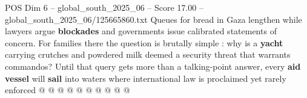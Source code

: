 \begin{textsample}{POS Dim 6 – global\_south\_2025\_06 – Score 17.00 – global\_south\_2025\_06/125665860.txt}
Queues for bread in Gaza lengthen while lawyers argue \textbf{blockades} and governments issue calibrated statements of concern.
For families there the question is brutally simple : why is a \textbf{yacht} carrying crutches and powdered milk deemed a security threat that warrants commandos?
Until that query gets more than a talking-point answer, every \textbf{aid} \textbf{vessel} will \textbf{sail} into waters where international law is proclaimed yet rarely enforced @ @ @ @ @ @ @ @ @ @

\end{textsample}
